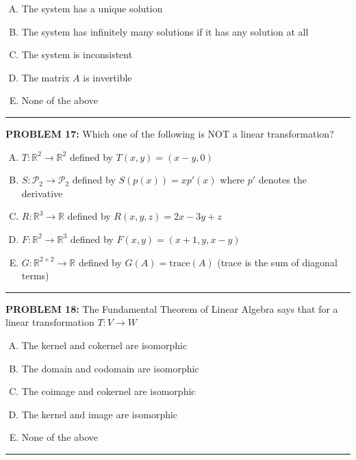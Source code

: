 \documentclass[12pt]{amsart}
\newcommand{\divider}{
  \vspace{-1em} %
  \noindent
  \raisebox{-0.15ex}{\textbullet}%
  \hspace{0.5em}%
  \rule[0.5ex]{0.95\textwidth}{1.0pt}%
  \hspace{0.5em}%
  \raisebox{-0.15ex}{\textbullet}%
  \vspace{0em} %
}
\begin{document}
\begin{enumerate}[(A)]
\item The system has a unique solution
\item The system has infinitely many solutions if it has any solution at all
\item The system is inconsistent
\item The matrix $A$ is invertible
\item None of the above
\end{enumerate}
\divider



{\bf PROBLEM 17:}
Which one of the following is NOT a linear transformation?

\begin{enumerate}[(A)]
\item $T: \mathbb{R}^2 \to \mathbb{R}^2$ defined by $T(x,y) = (x-y, 0)$
\item $S: \mathcal{P}_2 \to \mathcal{P}_2$ defined by $S(p(x)) = xp'(x)$ where $p'$ denotes the derivative
\item $R: \mathbb{R}^3 \to \mathbb{R}$ defined by $R(x,y,z) = 2x - 3y + z$
\item $F: \mathbb{R}^2 \to \mathbb{R}^3$ defined by $F(x,y) = (x+1, y, x-y)$
\item $G: \mathbb{R}^{2\times 2} \to \mathbb{R}$ defined by $G(A) = \text{trace}(A)$ (trace is the sum of diagonal terms)
\end{enumerate}
\divider


{\bf PROBLEM 18:}
The Fundamental Theorem of Linear Algebra says that for a linear transformation $T:V\to W$ 

\begin{enumerate}[(A)]
\item The kernel and cokernel are isomorphic
\item The domain and codomain are isomorphic
\item The coimage and cokernel are isomorphic
\item The kernel and image are isomorphic
\item None of the above
\end{enumerate}
\divider
\end{document}
